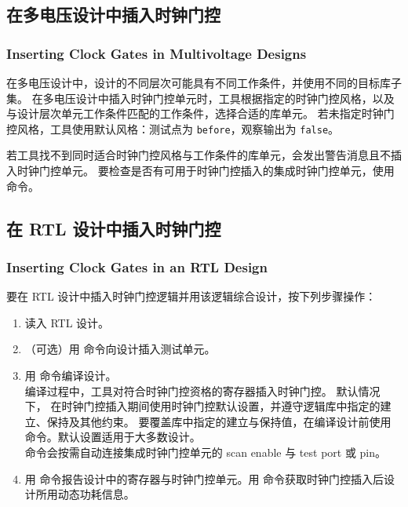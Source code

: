 \subsection{在多电压设计中插入时钟门控}
\subsubsection*{Inserting Clock Gates in Multivoltage Designs}

在多电压设计中，设计的不同层次可能具有不同工作条件，并使用不同的目标库子集。
在多电压设计中插入时钟门控单元时，工具根据指定的时钟门控风格，以及与设计层次单元工作条件匹配的工作条件，选择合适的库单元。
若未指定时钟门控风格，工具使用默认风格：测试点为 \texttt{before}，观察输出为 \texttt{false}。

若工具找不到同时适合时钟门控风格与工作条件的库单元，会发出警告消息且不插入时钟门控单元。
要检查是否有可用于时钟门控插入的集成时钟门控单元，使用  命令。

\subsection{在 RTL 设计中插入时钟门控}
\subsubsection*{Inserting Clock Gates in an RTL Design}

要在 RTL 设计中插入时钟门控逻辑并用该逻辑综合设计，按下列步骤操作：
\begin{enumerate}
  \item 读入 RTL 设计。
  \item （可选）用  命令向设计插入测试单元。
  \item 用  命令编译设计。\\
    编译过程中，工具对符合时钟门控资格的寄存器插入时钟门控。
    默认情况下， 在时钟门控插入期间使用时钟门控默认设置，并遵守逻辑库中指定的建立、保持及其他约束。
    要覆盖库中指定的建立与保持值，在编译设计前使用  命令。默认设置适用于大多数设计。\\
     命令会按需自动连接集成时钟门控单元的 scan enable 与 test port 或 pin。
  \item 用  命令报告设计中的寄存器与时钟门控单元。用  命令获取时钟门控插入后设计所用动态功耗信息。
\end{enumerate}

